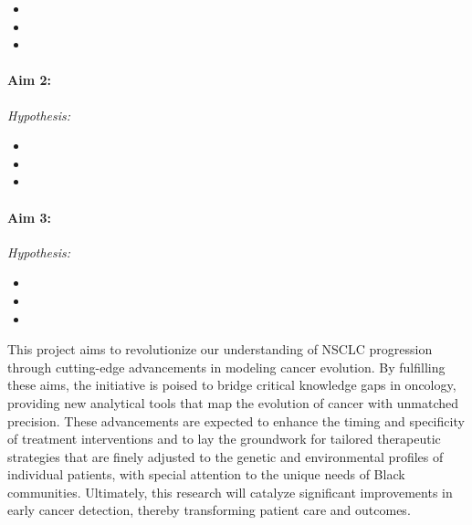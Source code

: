 \begin{itemize}[noitemsep]
    \item \SpecificAimOneA
    \item \SpecificAimOneB
    \item \SpecificAimOneC
\end{itemize}

\paragraph*{Aim 2: \SpecificAimTwo} 
\emph{Hypothesis:}

\begin{itemize}[noitemsep]
    \item \SpecificAimTwoA
    \item \SpecificAimTwoB
    \item \SpecificAimTwoC
\end{itemize}

\paragraph*{Aim 3: \SpecificAimThree} 
\emph{Hypothesis:}

\begin{itemize}[noitemsep]
    \item \SpecificAimThreeA
    \item \SpecificAimThreeB
    \item \SpecificAimThreeC
\end{itemize}

This project aims to revolutionize our understanding of NSCLC progression through cutting-edge advancements in modeling cancer evolution. 
By fulfilling these aims, the initiative is poised to bridge critical knowledge gaps in oncology, 
providing new analytical tools that map the evolution of cancer with unmatched precision. 
These advancements are expected to enhance the timing and specificity of treatment interventions 
and to lay the groundwork for tailored therapeutic strategies that are finely adjusted to the genetic and environmental profiles of individual patients, 
with special attention to the unique needs of Black communities. 
Ultimately, this research will catalyze significant improvements in early cancer detection, thereby transforming patient care and outcomes.
